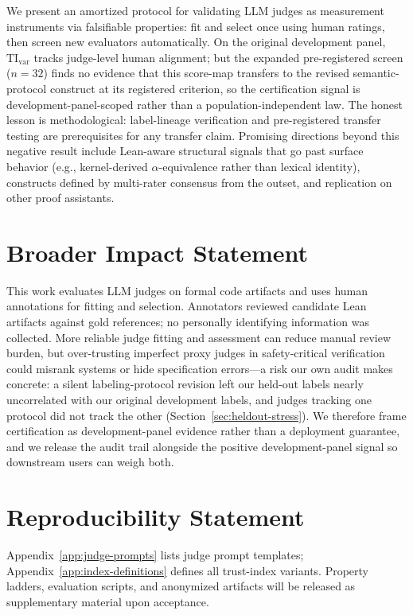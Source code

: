 \documentclass{article}
\begin{document}
We present an amortized protocol for validating LLM judges as measurement instruments via falsifiable properties: fit and select once using human ratings, then screen new evaluators automatically.
On the original development panel, \(\mathrm{TI}_{\mathrm{var}}\) tracks judge-level human alignment; but the expanded pre-registered screen (\(n{=}32\)) finds no evidence that this score-map transfers to the revised semantic-protocol construct at its registered criterion, so the certification signal is development-panel-scoped rather than a population-independent law.
The honest lesson is methodological: label-lineage verification and pre-registered transfer testing are prerequisites for any transfer claim. Promising directions beyond this negative result include Lean-aware structural signals that go past surface behavior (e.g., kernel-derived \(\alpha\)-equivalence rather than lexical identity), constructs defined by multi-rater consensus from the outset, and replication on other proof assistants.

\section*{Broader Impact Statement}
This work evaluates LLM judges on formal code artifacts and uses human annotations for fitting and selection. Annotators reviewed candidate Lean artifacts against gold references; no personally identifying information was collected. More reliable judge fitting and assessment can reduce manual review burden, but over-trusting imperfect proxy judges in safety-critical verification could misrank systems or hide specification errors---a risk our own audit makes concrete: a silent labeling-protocol revision left our held-out labels nearly uncorrelated with our original development labels, and judges tracking one protocol did not track the other (Section~\ref{sec:heldout-stress}). We therefore frame certification as development-panel evidence rather than a deployment guarantee, and we release the audit trail alongside the positive development-panel signal so downstream users can weigh both.

\section*{Reproducibility Statement}
Appendix~\ref{app:judge-prompts} lists judge prompt templates; Appendix~\ref{app:index-definitions} defines all trust-index variants. Property ladders, evaluation scripts, and anonymized artifacts will be released as supplementary material upon acceptance.
\end{document}
